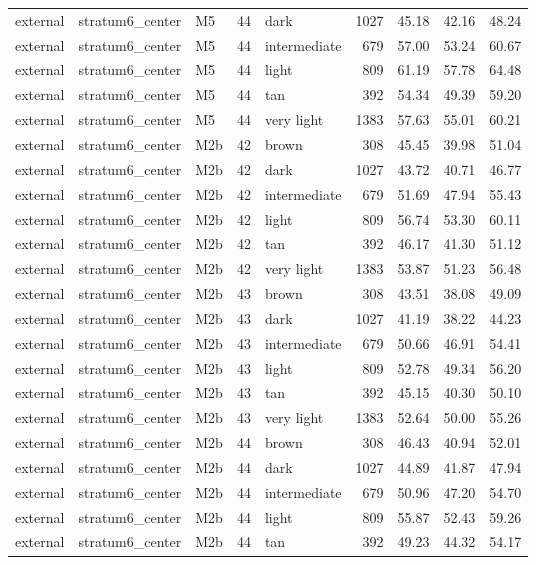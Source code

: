 \begin{tabular}{lllrlrrrr}
external & stratum6\_center & M5 & 44 & dark & 1027 & 45.18 & 42.16 & 48.24 \\
external & stratum6\_center & M5 & 44 & intermediate & 679 & 57.00 & 53.24 & 60.67 \\
external & stratum6\_center & M5 & 44 & light & 809 & 61.19 & 57.78 & 64.48 \\
external & stratum6\_center & M5 & 44 & tan & 392 & 54.34 & 49.39 & 59.20 \\
external & stratum6\_center & M5 & 44 & very light & 1383 & 57.63 & 55.01 & 60.21 \\
external & stratum6\_center & M2b & 42 & brown & 308 & 45.45 & 39.98 & 51.04 \\
external & stratum6\_center & M2b & 42 & dark & 1027 & 43.72 & 40.71 & 46.77 \\
external & stratum6\_center & M2b & 42 & intermediate & 679 & 51.69 & 47.94 & 55.43 \\
external & stratum6\_center & M2b & 42 & light & 809 & 56.74 & 53.30 & 60.11 \\
external & stratum6\_center & M2b & 42 & tan & 392 & 46.17 & 41.30 & 51.12 \\
external & stratum6\_center & M2b & 42 & very light & 1383 & 53.87 & 51.23 & 56.48 \\
external & stratum6\_center & M2b & 43 & brown & 308 & 43.51 & 38.08 & 49.09 \\
external & stratum6\_center & M2b & 43 & dark & 1027 & 41.19 & 38.22 & 44.23 \\
external & stratum6\_center & M2b & 43 & intermediate & 679 & 50.66 & 46.91 & 54.41 \\
external & stratum6\_center & M2b & 43 & light & 809 & 52.78 & 49.34 & 56.20 \\
external & stratum6\_center & M2b & 43 & tan & 392 & 45.15 & 40.30 & 50.10 \\
external & stratum6\_center & M2b & 43 & very light & 1383 & 52.64 & 50.00 & 55.26 \\
external & stratum6\_center & M2b & 44 & brown & 308 & 46.43 & 40.94 & 52.01 \\
external & stratum6\_center & M2b & 44 & dark & 1027 & 44.89 & 41.87 & 47.94 \\
external & stratum6\_center & M2b & 44 & intermediate & 679 & 50.96 & 47.20 & 54.70 \\
external & stratum6\_center & M2b & 44 & light & 809 & 55.87 & 52.43 & 59.26 \\
external & stratum6\_center & M2b & 44 & tan & 392 & 49.23 & 44.32 & 54.17 \\

\end{tabular}
